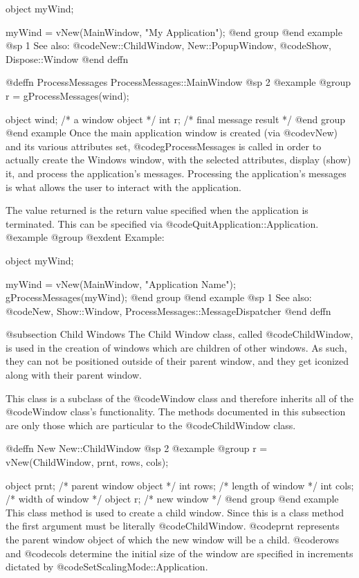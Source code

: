 object  myWind;

myWind = vNew(MainWindow, "My Application");
@end group
@end example
@sp 1
See also:  @code{New::ChildWindow, New::PopupWindow,}
      @code{Show, Dispose::Window}
@end deffn







@deffn {ProcessMessages} ProcessMessages::MainWindow
@sp 2
@example
@group
r = gProcessMessages(wind);

object  wind;   /*  a window object       */
int     r;      /*  final message result  */
@end group
@end example
Once the main application window is created (via @code{vNew}) and
its various attributes set, @code{gProcessMessages} is called in order
to actually create the Windows window, with the selected attributes,
display (show) it, and process the application's messages.  Processing
the application's messages is what allows the user to interact with the
application.

The value returned is the return value specified when the application is
terminated.  This can be specified via @code{QuitApplication::Application}.
@example
@group
@exdent Example:

object  myWind;

myWind = vNew(MainWindow, "Application Name");
gProcessMessages(myWind);
@end group
@end example
@sp 1
See also:  @code{New, Show::Window, ProcessMessages::MessageDispatcher}
@end deffn











@subsection Child Windows
The Child Window class, called @code{ChildWindow}, is used in the creation
of windows which are children of other windows.  As such, they can not
be positioned outside of their parent window, and they get iconized along
with their parent window.


This class is a subclass of the @code{Window} class and therefore
inherits all of the @code{Window} class's functionality.  The methods
documented in this subsection are only those which are particular
to the @code{ChildWindow} class.





@deffn {New} New::ChildWindow
@sp 2
@example
@group
r = vNew(ChildWindow, prnt, rows, cols);

object  prnt;   /*  parent window object  */
int     rows;   /*  length of window      */
int     cols;   /*  width of window       */
object  r;      /*  new window            */
@end group
@end example
This class method is used to create a child window.
Since this is a class method the first argument must be literally
@code{ChildWindow}.  @code{prnt} represents the parent window
object of which the new window will be a child.  @code{rows} and
@code{cols} determine the initial size of the window are specified
in increments dictated by @code{SetScalingMode::Application}.

